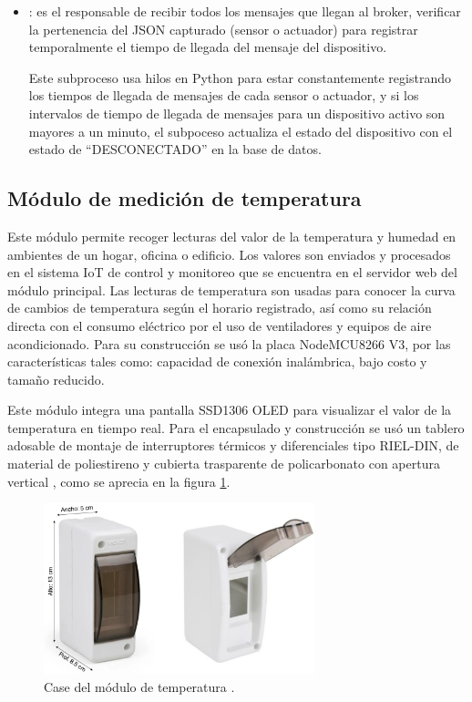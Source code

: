 \begin{itemize}
\item {}: es el responsable de recibir todos los mensajes que llegan al broker, verificar la pertenencia del JSON capturado (sensor o actuador) para registrar temporalmente el tiempo de llegada del mensaje del dispositivo. 

Este subproceso usa hilos en Python para estar constantemente registrando los tiempos de llegada de mensajes de cada sensor o actuador, y si los intervalos de tiempo de llegada de mensajes para un dispositivo activo son mayores a un minuto, el subpoceso actualiza el estado del dispositivo con el estado de ``DESCONECTADO'' en la base de datos.
\end{itemize}


\subsection{Módulo de medición de temperatura}

Este módulo permite recoger lecturas del valor de la temperatura y humedad en ambientes de un hogar, oficina o edificio. Los valores son enviados y procesados en el sistema IoT de control y monitoreo que se encuentra en el servidor web del módulo principal. Las lecturas de temperatura son usadas para conocer la curva de cambios de temperatura según el horario registrado, así como su relación directa con el consumo eléctrico por el uso de ventiladores y equipos de aire acondicionado. Para su construcción se usó la placa NodeMCU8266 V3, por las características tales como: capacidad de conexión inalámbrica, bajo costo y tamaño reducido. 

Este módulo integra una pantalla SSD1306 OLED para visualizar el valor de la temperatura en tiempo real. Para el encapsulado y construcción se usó un tablero adosable de montaje de interruptores térmicos y diferenciales tipo RIEL-DIN, de material de poliestireno y cubierta trasparente de policarbonato con apertura vertical \citep{WEBSITE:17}, como se aprecia en la figura \ref{fig:casetemp}.


\begin{figure}[htpb]
\centering 
\includegraphics[width=0.7\textwidth]{./Figures/casetemp.png}
\caption{Case del módulo de temperatura \protect\footnotemark.}
\label{fig:casetemp}
\end{figure}

